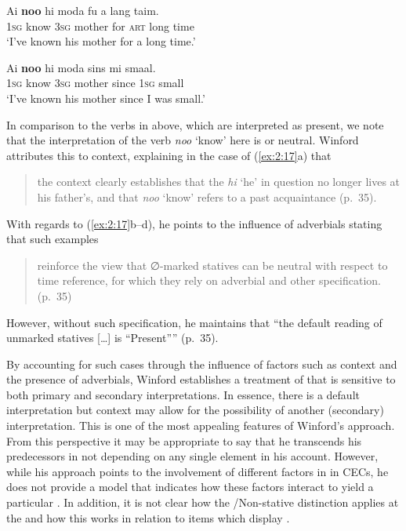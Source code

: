 \ex
\gll    Ai  \textbf{noo} hi                    moda      fu    a  lang taim.\\
\textsc{1sg}        know \textsc{3sg} mother for \textsc{art} long time\\
\glt `I’ve known his mother for a long time.'

\ex
\gll Ai  \textbf{noo} hi            moda        sins    mi                   smaal.\\
		\textsc{1sg} know \textsc{3sg}  mother     since   \textsc{1sg} small\\
\glt `I’ve known his mother since I was small.' 
\z \z

In comparison to the  verbs in  above, which are
interpreted as present, we note that the interpretation of the 
verb \textit{noo} `know' here is  or  neutral.  Winford
attributes this to context, explaining in the case of (\ref{ex:2:17}a)
that

\begin{quote}
the context clearly establishes that the \textit{hi} `he' in question
no longer lives at his father’s, and that \textit{noo} `know' refers
to a past acquaintance (p.~35).
\end{quote}

With regards to (\ref{ex:2:17}b--d), he points to the influence of
adverbials stating that such examples

\begin{quote}
reinforce the view that ∅-marked statives can be neutral with respect
to time reference, for which they rely on adverbial and other
specification. (p.~35)
\end{quote}

However, without such specification, he maintains that “the default
reading of unmarked statives […] is ``Present”” (p.~35).

By accounting for such cases through the influence of factors such as
context and the presence of adverbials, Winford establishes a
treatment of  that is sensitive to both primary and secondary
interpretations.  In essence, there is a default interpretation but
context may allow for the possibility of another (secondary)
interpretation.  This is one of the most appealing features of
Winford’s approach.  From this perspective it may be appropriate to
say that he transcends his predecessors in not depending on any single
element in his account.  However, while his approach points to the
involvement of different factors in  in CECs, he does not
provide a model that indicates how these factors interact to yield a
particular .  In addition, it is not clear how the
\slash Non-stative distinction applies at the  
and how this works in relation to items which display .

